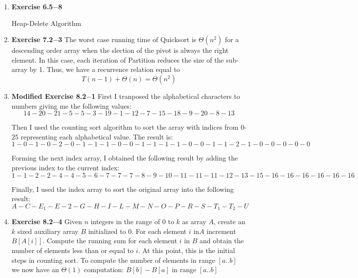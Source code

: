 \documentclass[a4paper,11pt,oneside]{book}
\begin{document}
\noindent{}
\normalsize

\begin{enumerate}
  \item {\textbf{Exercise 6.5$-$8}} 
  \begin{algorithm}
    \caption{Heap-Delete Algorithm}
    \begin{algorithmic}[1]
        \EndFunction
    \end{algorithmic}
\end{algorithm}

  \item {\textbf{Exercise 7.2$-$3}}
  The worst case running time of Quicksort is $\Theta\left(n^2\right)$ for a descending order array when the slection of the pivot is always the right element. 
  In this case, each iteration of Partition reduces the size of the sub-array by 1. Thus, we have a recurrence relation equal to 
  \[T(n-1)+\Theta(n) = \Theta(n^2)\]

  \item {\textbf{Modified Exercise 8.2$-$1}} First I tranposed the alphabetical characters to numbers giving me the following values:
  $$ 14-20-21-5-5-3-19-1-12-7-15-18-9-20-8-13$$

  Then I used the counting sort algorithm to sort the array with indices from 0-25 representing each alphabetical value. The result is:
  $$ 1-0-1-0-2-0-1-1-1-0-0-1-1-1-1-0-0-1-1-2-1-0-0-0-0-0$$

  Forming the next index array, I obtained the following result by adding the previous index to the current index:
  $$ 1-1-2-2-4-4-5-6-7-7-7-8-9-10-11-11-11-12-13-15-16-16-16-16-16-16$$

  Finally, I used the index array to sort the original array into the following result:
  $$ A-C-E_1-E-2-G-H-I-L-M-N-O-P-R-S-T_1-T_2-U$$
  
  \item {\textbf{Exercise 8.2$-$4}} Given $n$ integers in the range of 0 to $k$ as array $A$, create an $k$ sized auxiliary array $B$ initialized to $0$.
  For each element $i \text{ in} A$ increment $B[A[i]]$. Compute the running sum for each element $i$ in $B$ 
  and obtain the number of elements less than or equal to $i$. At this point, this is the initial steps in counting sort.
  To compute the number of elements in range $[a..b]$ we now have an $\Theta(1)$ computation: $B[b] - B[a]$
  in range $[a..b]$   
  

\end{enumerate}
\end{document}
